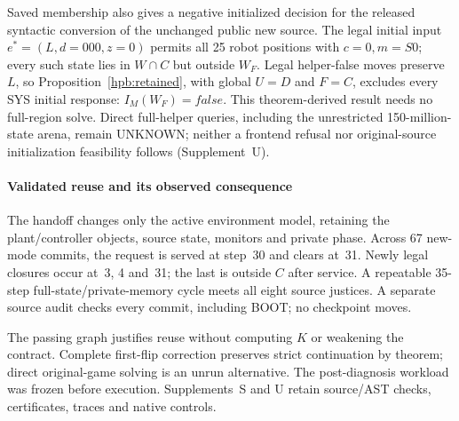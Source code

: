 Saved membership also gives a negative initialized decision for the
released syntactic conversion of the unchanged public new source.
The legal initial input $e^*=(L,d=000,z=0)$
permits all 25 robot positions with $c=0,m=S0$; every such state lies
in $W\cap C$ but outside $W_F$. Legal helper-false moves preserve $L$, so
Proposition~\ref{hpb:retained}, with global $U=D$ and $F=C$, excludes
every SYS initial response: $I_M(W_F)=\mathit{false}$. This theorem-derived
result needs no full-region solve. Direct full-helper queries, including
the unrestricted 150-million-state arena, remain UNKNOWN; neither a
frontend refusal nor original-source initialization feasibility follows
(Supplement~U).

\paragraph{Validated reuse and its observed consequence}
The handoff changes only the active environment model, retaining the
plant/controller objects, source state, monitors and private phase.
Across 67 new-mode commits, the request is served at step~30 and clears
at~31. Newly legal closures occur at~3, 4 and~31; the last is outside
$C$ after service. A repeatable 35-step full-state/private-memory cycle
meets all eight source justices. A separate source audit checks every
commit, including BOOT; no checkpoint moves.

The passing graph justifies reuse without computing $K$ or weakening
the contract. Complete first-flip correction preserves strict continuation
by theorem; direct original-game solving is an unrun alternative.
The post-diagnosis workload was frozen before execution. Supplements~S
and U retain source/AST checks, certificates, traces and native controls.
